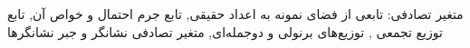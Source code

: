 \documentclass[a4paper,11pt,oneside,openany]{book}
\begin{document}
  {{متغیر تصادفی: تابعی از فضای نمونه به اعداد حقیقی},
   {تابع جرم احتمال  و خواص آن},
   {تابع توزیع تجمعی },
   {توزیع‌های برنولی و دوجمله‌ای},
   {متغیر تصادفی نشانگر و جبر نشانگرها}}

\mainmatter
\setcounter{chapter}{4}   %

\end{document}
